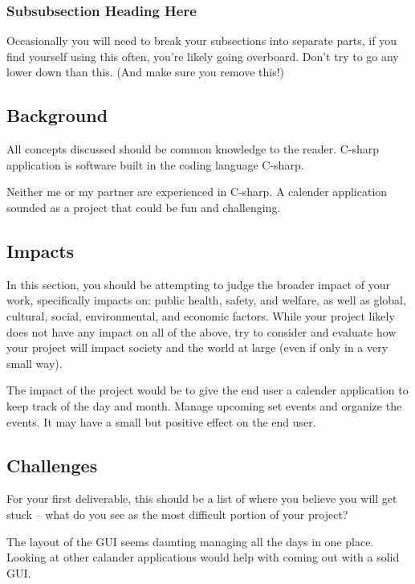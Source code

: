 \documentclass[10pt,conference,onecolumn,compsoc]{IEEEtran}
\begin{document}

\subsubsection{Subsubsection Heading Here}
Occasionally you will need to break your subsections into separate parts, if you find yourself using this often, you're likely going overboard.  Don't try to go any lower down than this. (And make sure you remove this!)



\subsection{Background}
All concepts discussed should be common knowledge to the reader. C-sharp application is software built in the coding language C-sharp.

Neither me or my partner are experienced in C-sharp. A calender application sounded as a project that could be fun and challenging. 

\subsection{Impacts}
In this section, you should be attempting to judge the broader impact of your work, specifically impacts on: public health, safety, and welfare, as well as global, cultural, social, environmental, and economic factors.  While your project likely does not have any impact on all of the above, try to consider and evaluate how your project will impact society and the world at large (even if only in a very small way).

The impact of the project would be to give the end user a calender application to keep track of the day and month. Manage upcoming set events and organize the events. It may have a small but positive effect on the end user.

\subsection{Challenges}
For your first deliverable, this should be a list of where you believe you will get stuck -- what do you see as the most difficult portion of your project?

The layout of the GUI seems daunting managing all the days in one place. Looking at other calander applications would help with coming out with a solid GUI.
\end{document}
